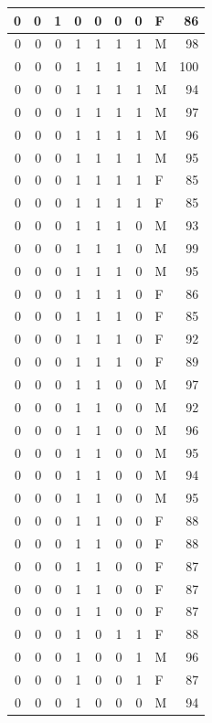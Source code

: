 \documentclass[
  12pt,
]{krantz}
\begin{document}
\begin{tabular}{r|r|r|r|r|r|r|l|r}
\hline
0 & 0 & 1 & 0 & 0 & 0 & 0 & F & 86\\
\hline
0 & 0 & 0 & 1 & 1 & 1 & 1 & M & 98\\
\hline
0 & 0 & 0 & 1 & 1 & 1 & 1 & M & 100\\
\hline
0 & 0 & 0 & 1 & 1 & 1 & 1 & M & 94\\
\hline
0 & 0 & 0 & 1 & 1 & 1 & 1 & M & 97\\
\hline
0 & 0 & 0 & 1 & 1 & 1 & 1 & M & 96\\
\hline
0 & 0 & 0 & 1 & 1 & 1 & 1 & M & 95\\
\hline
0 & 0 & 0 & 1 & 1 & 1 & 1 & F & 85\\
\hline
0 & 0 & 0 & 1 & 1 & 1 & 1 & F & 85\\
\hline
0 & 0 & 0 & 1 & 1 & 1 & 0 & M & 93\\
\hline
0 & 0 & 0 & 1 & 1 & 1 & 0 & M & 99\\
\hline
0 & 0 & 0 & 1 & 1 & 1 & 0 & M & 95\\
\hline
0 & 0 & 0 & 1 & 1 & 1 & 0 & F & 86\\
\hline
0 & 0 & 0 & 1 & 1 & 1 & 0 & F & 85\\
\hline
0 & 0 & 0 & 1 & 1 & 1 & 0 & F & 92\\
\hline
0 & 0 & 0 & 1 & 1 & 1 & 0 & F & 89\\
\hline
0 & 0 & 0 & 1 & 1 & 0 & 0 & M & 97\\
\hline
0 & 0 & 0 & 1 & 1 & 0 & 0 & M & 92\\
\hline
0 & 0 & 0 & 1 & 1 & 0 & 0 & M & 96\\
\hline
0 & 0 & 0 & 1 & 1 & 0 & 0 & M & 95\\
\hline
0 & 0 & 0 & 1 & 1 & 0 & 0 & M & 94\\
\hline
0 & 0 & 0 & 1 & 1 & 0 & 0 & M & 95\\
\hline
0 & 0 & 0 & 1 & 1 & 0 & 0 & F & 88\\
\hline
0 & 0 & 0 & 1 & 1 & 0 & 0 & F & 88\\
\hline
0 & 0 & 0 & 1 & 1 & 0 & 0 & F & 87\\
\hline
0 & 0 & 0 & 1 & 1 & 0 & 0 & F & 87\\
\hline
0 & 0 & 0 & 1 & 1 & 0 & 0 & F & 87\\
\hline
0 & 0 & 0 & 1 & 0 & 1 & 1 & F & 88\\
\hline
0 & 0 & 0 & 1 & 0 & 0 & 1 & M & 96\\
\hline
0 & 0 & 0 & 1 & 0 & 0 & 1 & F & 87\\
\hline
0 & 0 & 0 & 1 & 0 & 0 & 0 & M & 94\\

\end{tabular}
\end{document}

